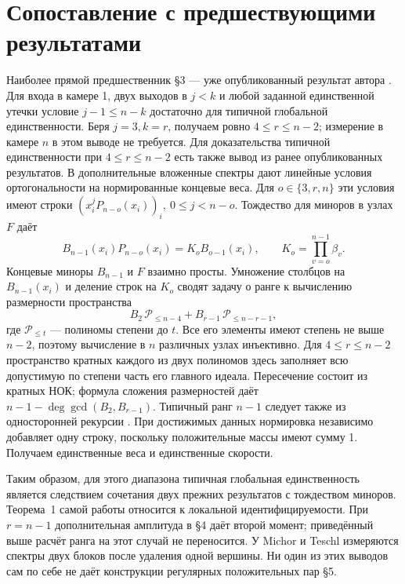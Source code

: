 \documentclass[11pt,a4paper]{article}
\begin{document}
\section*{Сопоставление с предшествующими результатами}
Наиболее прямой предшественник §3 --- уже опубликованный результат автора \cite{endp}. Для входа в камере 1, двух выходов в \(j<k\) и любой заданной единственной утечки условие \(j-1\le n-k\) достаточно для типичной глобальной единственности. Беря \(j=3,k=r\), получаем ровно \(4\le r\le n-2\); измерение в камере \(n\) в этом выводе не требуется. Для доказательства типичной единственности при \(4\le r\le n-2\) есть также вывод из ранее опубликованных результатов. В \cite[лемма 2.1, §6]{cg} дополнительные вложенные спектры дают линейные условия ортогональности на нормированные концевые веса. Для \(o\in\{3,r,n\}\) эти условия имеют строки \((x_i^j P_{n-o}(x_i))_i,\ 0\le j<n-o\). Тождество для миноров в узлах \(F\) даёт
\[
 B_{n-1}(x_i)P_{n-o}(x_i)=K_o B_{o-1}(x_i),
 \qquad K_o=\prod_{v=o}^{n-1}\beta_v .
\]
Концевые миноры \(B_{n-1}\) и \(F\) взаимно просты. Умножение столбцов на \(B_{n-1}(x_i)\) и деление строк на \(K_o\) сводят задачу о ранге к вычислению размерности пространства
\[
 B_2\,\mathcal P_{\le n-4}+B_{r-1}\,\mathcal P_{\le n-r-1},
\]
где \(\mathcal P_{\le t}\) --- полиномы степени до \(t\). Все его элементы имеют степень не выше \(n-2\), поэтому вычисление в \(n\) различных узлах инъективно. Для \(4\le r\le n-2\) пространство кратных каждого из двух полиномов здесь заполняет всю допустимую по степени часть его главного идеала. Пересечение состоит из кратных НОК; формула сложения размерностей даёт \(n-1-\deg\gcd(B_2,B_{r-1})\). Типичный ранг \(n-1\) следует также из односторонней рекурсии \cite[приложение C.2, с.~22]{anon}. При достижимых данных нормировка независимо добавляет одну строку, поскольку положительные массы имеют сумму 1. Получаем единственные веса и единственные скорости.

Таким образом, для этого диапазона типичная глобальная единственность является следствием сочетания двух прежних результатов с тождеством миноров. Теорема~1 самой работы \cite{anon} относится к локальной идентифицируемости. При \(r=n-1\) дополнительная амплитуда в §4 даёт второй момент; приведённый выше расчёт ранга на этот случай не переносится. У Michor и Teschl \cite[теорема 2.1]{mt} измеряются спектры двух блоков после удаления одной вершины. Ни один из этих выводов сам по себе не даёт конструкции регулярных положительных пар §5.
\end{document}
